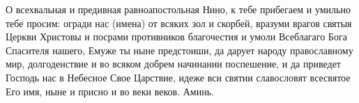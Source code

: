 \mychapterending


\begin{mymulticols}



О всехвальная и предивная равноапостольная Нино, к тебе прибегаем и умильно тебе просим: огради нас (имена) от всяких зол и скорбей, вразуми врагов святыя Церкви Христовы и посрами противников благочестия и умоли Всеблагаго Бога Спасителя нашего, Емуже ты ныне предстоиши, да дарует народу православному мир, долгоденствие и во всяком добрем начинании поспешение, и да приведет Господь нас в Небесное Свое Царствие, идеже  вси святии славословят всесвятое Его имя, ныне и присно и во веки веков. Аминь.

\end{mymulticols}

\mychapterending


